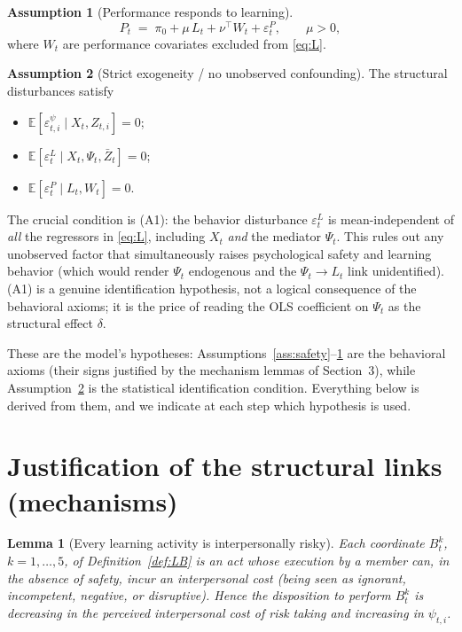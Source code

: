 \documentclass{amsart}
\newtheorem{lemma}{Lemma}
\theoremstyle{definition}
\newtheorem{assumption}{Assumption}
\theoremstyle{remark}
\begin{document}
\begin{assumption}[Performance responds to learning]\label{ass:perf}
\begin{equation}\label{eq:P}
P_t \;=\; \pi_0 + \mu\, L_t + \nu^{\top} W_t + \varepsilon^{P}_t,
\qquad \mu>0,
\end{equation}
where $W_t$ are performance covariates excluded from \eqref{eq:L}.
\end{assumption}

\begin{assumption}[Strict exogeneity / no unobserved confounding]\label{ass:exog}
The structural disturbances satisfy
\begin{itemize}
\item[(A0)] $\mathbb{E}[\varepsilon^{\psi}_{t,i}\mid X_t,Z_{t,i}]=0$;
\item[(A1)] $\mathbb{E}[\varepsilon^{L}_t\mid X_t,\Psi_t,\bar Z_t]=0$;
\item[(A2)] $\mathbb{E}[\varepsilon^{P}_t\mid L_t,W_t]=0$.
\end{itemize}
The crucial condition is (A1): the behavior disturbance
$\varepsilon^L_t$ is mean-independent of \emph{all} the regressors in
\eqref{eq:L}, including $X_t$ \emph{and} the mediator $\Psi_t$. This rules
out any unobserved factor that simultaneously raises psychological safety
and learning behavior (which would render $\Psi_t$ endogenous and the
$\Psi_t\to L_t$ link unidentified). (A1) is a genuine identification
hypothesis, not a logical consequence of the behavioral axioms; it is the
price of reading the OLS coefficient on $\Psi_t$ as the structural effect
$\delta$.
\end{assumption}

These are the model's hypotheses: Assumptions~\ref{ass:safety}--\ref{ass:perf}
are the behavioral axioms (their signs justified by the mechanism lemmas of
Section~3), while Assumption~\ref{ass:exog} is the statistical
identification condition. Everything below is derived from them, and we
indicate at each step which hypothesis is used.

\section{Justification of the structural links (mechanisms)}

\begin{lemma}[Every learning activity is interpersonally risky]\label{lem:risk}
Each coordinate $B_t^k$, $k=1,\dots,5$, of Definition~\ref{def:LB} is an
act whose execution by a member can, in the absence of safety, incur an
interpersonal cost (being seen as ignorant, incompetent, negative, or
disruptive). Hence the disposition to perform $B_t^k$ is decreasing in the
\emph{perceived} interpersonal cost of risk taking and increasing in
$\psi_{t,i}$.
\end{lemma}
\end{document}
